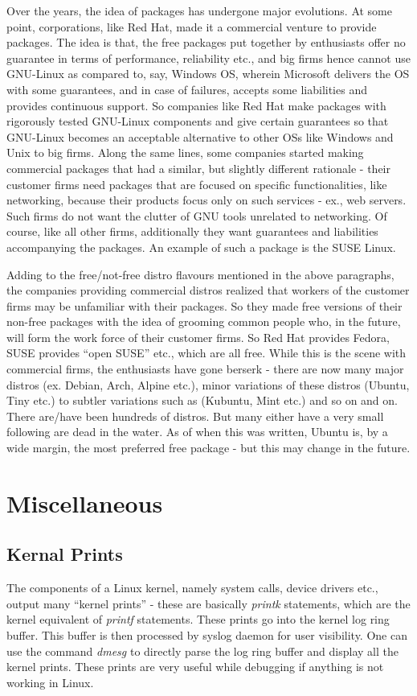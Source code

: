 Over the years, the idea of packages has undergone major evolutions. At some point, corporations, like Red Hat, made it a commercial venture to provide packages. The idea is that, the free packages put together by enthusiasts offer no guarantee in terms of performance, reliability etc., and big firms hence cannot use GNU-Linux as compared to, say, Windows OS, wherein Microsoft delivers the OS with some guarantees, and in case of failures, accepts some liabilities and provides continuous support.  So companies like Red Hat make packages with rigorously tested GNU-Linux components and give certain guarantees so that GNU-Linux becomes an acceptable alternative to other OSs like Windows and Unix to big firms. Along the same lines, some companies started making commercial packages that had a similar, but slightly different rationale - their customer firms need packages that are focused on specific functionalities, like networking, because their products focus only on such services - ex., web servers. Such firms do not want the clutter of GNU tools unrelated to networking. Of course, like all other firms, additionally they want guarantees and liabilities accompanying the packages. An example of such a package is the SUSE Linux. 

Adding to the free/not-free distro flavours mentioned in the above paragraphs, the companies providing commercial distros realized that workers of the customer firms may be unfamiliar with their packages. So they made free versions of their non-free packages with the idea of grooming common people who, in the future, will form the work force of their customer firms. So Red Hat provides Fedora, SUSE provides ``open SUSE'' etc., which are all free. While this is the scene with commercial firms, the enthusiasts have gone berserk - there are now many major distros (ex. Debian, Arch, Alpine etc.), minor variations of these distros (Ubuntu, Tiny etc.) to subtler variations such as (Kubuntu, Mint etc.) and so on and on. There are/have been hundreds of distros. But many either have a very small following are dead in the water. As of when this was written, Ubuntu is, by a wide margin, the most preferred free package - but this may change in the future.

\section{Miscellaneous}
\subsection{Kernal Prints}
The components of a Linux kernel, namely system calls, device drivers etc., output many ``kernel prints'' - these are basically \emph{printk} statements, which are the kernel equivalent of \emph{printf} statements. These prints go into the kernel log ring buffer. This buffer is then processed by syslog daemon for user visibility. One can use the command \emph{dmesg} to directly parse the log ring buffer and display all the kernel prints. These prints are very useful while debugging if anything is not working in Linux.


